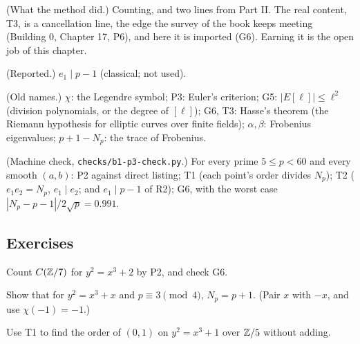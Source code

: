 \begin{lines}
\item[\lab{R1}] (What the method did.) Counting, and two lines from Part II. The real content, T3, is a cancellation line, the edge the survey of the book keeps meeting (Building 0, Chapter 17, P6), and here it is imported (G6). Earning it is the open job of this chapter.
\item[\lab{R2}] (Reported.) $e_1 \mid p - 1$ (classical; not used).
\item[\lab{R3}] (Old names.) $\chi$: the Legendre symbol; P3: Euler's criterion; G5: $|E[\ell]| \le \ell^2$ (division polynomials, or the degree of $[\ell]$); G6, T3: Hasse's theorem (the Riemann hypothesis for elliptic curves over finite fields); $\alpha, \beta$: Frobenius eigenvalues; $p + 1 - N_p$: the trace of Frobenius.
\item[\lab{R4}] (Machine check, \texttt{checks/b1-p3-check.py}.) For every prime $5 \le p < 60$ and every smooth $(a, b)$: P2 against direct listing; T1 (each point's order divides $N_p$); T2 ($e_1 e_2 = N_p$, $e_1 \mid e_2$; and $e_1 \mid p - 1$ of R2); G6, with the worst case $|N_p - p - 1| / 2\sqrt p = 0.991$.
\end{lines}

\subsection*{Exercises}

\begin{lines}
\item[\lab{E1}] Count $C(\mathbb{Z}/7)$ for $y^2 = x^3 + 2$ by P2, and check G6.
\item[\lab{E2}] Show that for $y^2 = x^3 + x$ and $p \equiv 3 \pmod 4$, $N_p = p + 1$. (Pair $x$ with $-x$, and use $\chi(-1) = -1$.)
\item[\lab{E3}] Use T1 to find the order of $(0, 1)$ on $y^2 = x^3 + 1$ over $\mathbb{Z}/5$ without adding.
\end{lines}
